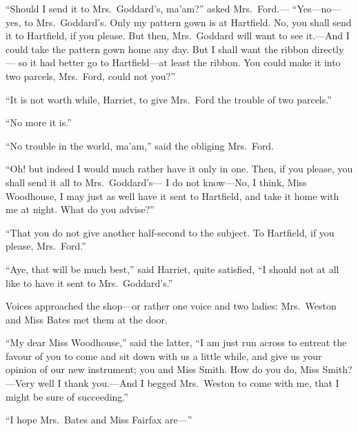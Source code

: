 ``Should I send it to Mrs.\ Goddard's, ma'am?'' asked Mrs.\ Ford.---%
``Yes---no---yes, to Mrs.\ Goddard's. Only my pattern gown is
at Hartfield.  No, you shall send it to Hartfield, if you please.
But then, Mrs.\ Goddard will want to see it.---And I could take the
pattern gown home any day.  But I shall want the ribbon directly---%
so it had better go to Hartfield---at least the ribbon.  You could
make it into two parcels, Mrs.\ Ford, could not you?''

``It is not worth while, Harriet, to give Mrs.\ Ford the trouble
of two parcels.''

``No more it is.''

``No trouble in the world, ma'am,'' said the obliging Mrs.\ Ford.

``Oh! but indeed I would much rather have it only in one.
Then, if you please, you shall send it all to Mrs.\ Goddard's---%
I do not know---No, I think, Miss Woodhouse, I may just as well
have it sent to Hartfield, and take it home with me at night.
What do you advise?''

``That you do not give another half-second to the subject.
To Hartfield, if you please, Mrs.\ Ford.''

``Aye, that will be much best,'' said Harriet, quite satisfied,
``I should not at all like to have it sent to Mrs.\ Goddard's.''

Voices approached the shop---or rather one voice and two ladies:
Mrs.\ Weston and Miss Bates met them at the door.

``My dear Miss Woodhouse,'' said the latter, ``I am just run across to
entreat the favour of you to come and sit down with us a little while,
and give us your opinion of our new instrument; you and Miss Smith.
How do you do, Miss Smith?---Very well I thank you.---And I begged
Mrs.\ Weston to come with me, that I might be sure of succeeding.''

``I hope Mrs.\ Bates and Miss Fairfax are---''

